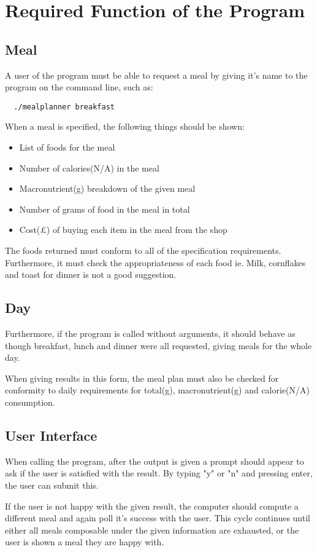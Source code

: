 \documentclass[a4paper]{article}
\begin{document}
\section{Required Function of the Program}

\subsection{Meal}

A user of the program must be able to request a meal by giving it's name 
to the program on the command line, such as:

\begin{verbatim}
  ./mealplanner breakfast
\end{verbatim}

When a meal is specified, the following things should be shown:

\begin{itemize}
  \item List of foods for the meal
  \item Number of calories(N/A) in the meal
  \item Macronutrient(g) breakdown of the given meal
  \item Number of grams of food in the meal in total
  \item Cost(£) of buying each item in the meal from the shop
\end{itemize}

The foods returned must conform to all of the specification 
requirements. Furthermore, it must check the appropriateness of each 
food ie. Milk, cornflakes and toast for dinner is not a good suggestion.

\subsection{Day}

Furthermore, if the program is called without arguments, it should 
behave as though breakfast, lunch and dinner were all requested, giving 
meals for the whole day.

When giving results in this form, the meal plan must also be checked for 
conformity to daily requirements for total(g), macronutrient(g) and 
calorie(N/A) consumption.

\subsection{User Interface}

When calling the program, after the output is given a prompt should 
appear to ask if the user is satisfied with the result. By typing "y" or 
"n" and pressing enter, the user can submit this.

If the user is not happy with the given result, the computer should 
compute a different meal and again poll it's success with the user. This 
cycle continues until either all meals composable under the given 
information are exhausted, or the user is shown a meal they are happy 
with.
\end{document}
